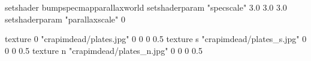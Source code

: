 setshader bumpspecmapparallaxworld
setshaderparam "specscale" 3.0 3.0 3.0
setshaderparam "parallaxscale" 0

texture 0 "crapimdead/plates.jpg" 0 0 0 0.5
texture s "crapimdead/plates_s.jpg" 0 0 0 0.5
texture n "crapimdead/plates_n.jpg" 0 0 0 0.5
